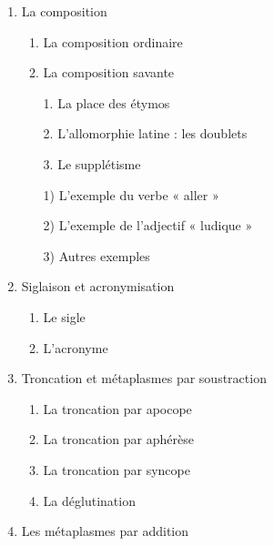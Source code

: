 \begin{keybox}
\begin{enumerate}[label=\arabic*.]
\begin{enumerate}[label=\textcircled{\scriptsize\arabic*}]
\item La dérivation parasynthétique
\item La dérivation impropre (conversion)\par
1. La substantivation\par
\hspace{1em}1) la métonymie\par
\hspace{1em}2) l’antonomase\par
2. L’adjectivation\par
3. L’adverbialisation
\end{enumerate}
\item La composition
\begin{enumerate}[label=\textcircled{\scriptsize\arabic*}]
\item La composition ordinaire
\item La composition savante\par
1. La place des étymos\par
2. L’allomorphie latine : les doublets\par
3. Le supplétisme\par
\hspace{1em}1) L’exemple du verbe « aller »\par
\hspace{1em}2) L’exemple de l’adjectif « ludique »\par
\hspace{1em}3) Autres exemples
\end{enumerate}
\item Siglaison et acronymisation
\begin{enumerate}[label=\textcircled{\scriptsize\arabic*}]
\item Le sigle
\item L’acronyme
\end{enumerate}
\item Troncation et métaplasmes par soustraction
\begin{enumerate}[label=\textcircled{\scriptsize\arabic*}]
\item La troncation par apocope
\item La troncation par aphérèse
\item La troncation par syncope
\item La déglutination
\end{enumerate}
\item Les métaplasmes par addition
\begin{enumerate}[label=\textcircled{\scriptsize\arabic*}]

\end{enumerate}
\end{enumerate}
\end{keybox}

